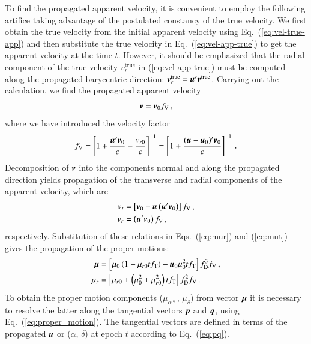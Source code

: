 \documentclass{aa}
\def\vec#1{\ensuremath{\mathchoice{\mbox{\boldmath$\displaystyle#1$}}
{\mbox{\boldmath$\textstyle#1$}}
{\mbox{\boldmath$\scriptstyle#1$}}
{\mbox{\boldmath$\scriptscriptstyle#1$}}}}
\begin{document}
To find the propagated apparent velocity, it is convenient to employ the following artifice taking advantage of the postulated constancy of the true velocity. We first obtain the true velocity from the initial apparent velocity using Eq.~(\ref{eq:vel-true-app}) and then substitute the true velocity in Eq.~(\ref{eq:vel-app-true}) to get the apparent velocity at the time $t$.
However, it should be emphasized that the radial component of the true velocity $v_r^\mathrm{true}$ in (\ref{eq:vel-app-true}) must be computed
along the propagated barycentric direction:
$v_r^\mathrm{true}=\vec{u}'\vec{v}^\mathrm{true}$. Carrying out the calculation,
we find the propagated apparent velocity
\begin{equation}\label{eq:vel-app-vel-app0}
    \vec{v}=\vec{v}_0 f_\mathrm{V}\,,
\end{equation}
where we have introduced the velocity factor
\begin{equation}\label{eq:fv-definition}
    f_\mathrm{V}=
    \left[1+\dfrac{\vec{u}'\vec{v}_0}{c}-\dfrac{v_{r0}}{c}\right]^{-1}=
    \left[1+\dfrac{(\vec{u}-\vec{u}_0)'\vec{v}_0}{c}\right]^{-1}\,.
\end{equation}
Decomposition of $\vec{v}$ into the components normal and along the propagated direction yields propagation of the transverse and radial components of the apparent velocity, which are
\begin{align}
    \vec{v}_t&=
    \left[\vec{v}_0-\vec{u}\left(\vec{u}'\vec{v}_0\right)\right]
    f_\mathrm{V}\,, \\
    v_r&=
    \left(\vec{u}'\vec{v}_0\right)f_\mathrm{V}\,,
\end{align}
respectively. Substitution of these relations in Eqs.~(\ref{eq:mur}) and (\ref{eq:mut}) gives the propagation of the proper motions:
\begin{align}
    \label{eq:mu_prop}
    \vec{\mu}&=
    \left[\vec{\mu}_0\left(1+\mu_{r0}tf_\mathrm{T}\right)-
    \vec{u}_0\mu_0^2tf_\mathrm{T}\right]
    f_\mathrm{D}^3f_\mathrm{V}\,, \\
    \label{eq:mur_prop}
    \mu_r&=
    \left[\mu_{r0}+\left(\mu_0^2+\mu_{r0}^2\right)tf_\mathrm{T}\right]
    f_\mathrm{D}^2f_\mathrm{V}\,.
\end{align}
To obtain the proper motion components ($\mu_{\alpha*}$, $\mu_\delta$) from vector $\vec{\mu}$ it is necessary to resolve the latter along the tangential vectors $\vec{p}$ and $\vec{q}$, using Eq.~(\ref{eq:proper_motion}). The
tangential vectors are defined in terms of the propagated $\vec{u}$ or ($\alpha$,
$\delta$) at epoch $t$ according to Eq.~(\ref{eq:pq}).
\end{document}
